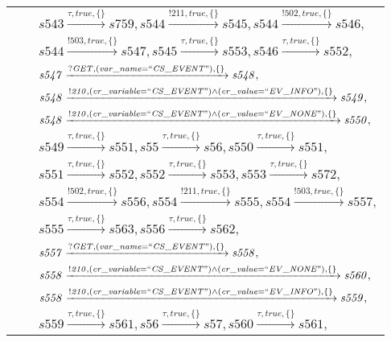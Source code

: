 \begin{tabular}{lcp{350px}}
& & $\mathit{s543}\xrightarrow{\mathit{\tau}, \mathit{true}, \{\}}\mathit{s759},\mathit{s544}\xrightarrow{\mathit{!211}, \mathit{true}, \{\}}\mathit{s545},\mathit{s544}\xrightarrow{\mathit{!502}, \mathit{true}, \{\}}\mathit{s546},$ \\
& & $\mathit{s544}\xrightarrow{\mathit{!503}, \mathit{true}, \{\}}\mathit{s547},\mathit{s545}\xrightarrow{\mathit{\tau}, \mathit{true}, \{\}}\mathit{s553},\mathit{s546}\xrightarrow{\mathit{\tau}, \mathit{true}, \{\}}\mathit{s552},$ \\
& & $\mathit{s547}\xrightarrow{\mathit{?GET}, \mathit{(var\_name = ``CS\_EVENT")}, \{\}}\mathit{s548},$ \\
& & $\mathit{s548}\xrightarrow{\mathit{!210}, \mathit{(cr\_variable = ``CS\_EVENT") \land (cr\_value = ``EV\_INFO")}, \{\}}\mathit{s549},$ \\
& & $\mathit{s548}\xrightarrow{\mathit{!210}, \mathit{(cr\_variable = ``CS\_EVENT") \land (cr\_value = ``EV\_NONE")}, \{\}}\mathit{s550},$ \\
& & $\mathit{s549}\xrightarrow{\mathit{\tau}, \mathit{true}, \{\}}\mathit{s551},\mathit{s55}\xrightarrow{\mathit{\tau}, \mathit{true}, \{\}}\mathit{s56},\mathit{s550}\xrightarrow{\mathit{\tau}, \mathit{true}, \{\}}\mathit{s551},$ \\
& & $\mathit{s551}\xrightarrow{\mathit{\tau}, \mathit{true}, \{\}}\mathit{s552},\mathit{s552}\xrightarrow{\mathit{\tau}, \mathit{true}, \{\}}\mathit{s553},\mathit{s553}\xrightarrow{\mathit{\tau}, \mathit{true}, \{\}}\mathit{s572},$ \\
& & $\mathit{s554}\xrightarrow{\mathit{!502}, \mathit{true}, \{\}}\mathit{s556},\mathit{s554}\xrightarrow{\mathit{!211}, \mathit{true}, \{\}}\mathit{s555},\mathit{s554}\xrightarrow{\mathit{!503}, \mathit{true}, \{\}}\mathit{s557},$ \\
& & $\mathit{s555}\xrightarrow{\mathit{\tau}, \mathit{true}, \{\}}\mathit{s563},\mathit{s556}\xrightarrow{\mathit{\tau}, \mathit{true}, \{\}}\mathit{s562},$ \\
& & $\mathit{s557}\xrightarrow{\mathit{?GET}, \mathit{(var\_name = ``CS\_EVENT")}, \{\}}\mathit{s558},$ \\
& & $\mathit{s558}\xrightarrow{\mathit{!210}, \mathit{(cr\_variable = ``CS\_EVENT") \land (cr\_value = ``EV\_NONE")}, \{\}}\mathit{s560},$ \\
& & $\mathit{s558}\xrightarrow{\mathit{!210}, \mathit{(cr\_variable = ``CS\_EVENT") \land (cr\_value = ``EV\_INFO")}, \{\}}\mathit{s559},$ \\
& & $\mathit{s559}\xrightarrow{\mathit{\tau}, \mathit{true}, \{\}}\mathit{s561},\mathit{s56}\xrightarrow{\mathit{\tau}, \mathit{true}, \{\}}\mathit{s57},\mathit{s560}\xrightarrow{\mathit{\tau}, \mathit{true}, \{\}}\mathit{s561},$ \\
\end{tabular}

